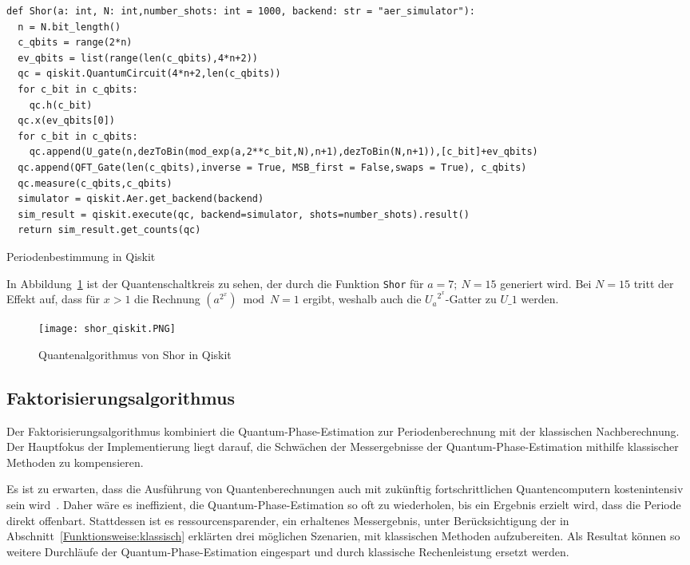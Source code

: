 \begin{listing}[H]
\begin{verbatim}  
def Shor(a: int, N: int,number_shots: int = 1000, backend: str = "aer_simulator"):
  n = N.bit_length()
  c_qbits = range(2*n)
  ev_qbits = list(range(len(c_qbits),4*n+2))
  qc = qiskit.QuantumCircuit(4*n+2,len(c_qbits)) 
  for c_bit in c_qbits:
    qc.h(c_bit)
  qc.x(ev_qbits[0])
  for c_bit in c_qbits:
    qc.append(U_gate(n,dezToBin(mod_exp(a,2**c_bit,N),n+1),dezToBin(N,n+1)),[c_bit]+ev_qbits)
  qc.append(QFT_Gate(len(c_qbits),inverse = True, MSB_first = False,swaps = True), c_qbits)
  qc.measure(c_qbits,c_qbits)
  simulator = qiskit.Aer.get_backend(backend)
  sim_result = qiskit.execute(qc, backend=simulator, shots=number_shots).result()
  return sim_result.get_counts(qc)
  \end{verbatim}
  \caption{Periodenbestimmung in Qiskit}
  \label{code:Periodenbestimmung}
\end{listing}

In Abbildung~\ref{fig:shor_qiskit} ist der Quantenschaltkreis zu sehen, 
der durch die Funktion \texttt{Shor} für \(a=7;~N=15\) generiert wird.
Bei \(N=15\) tritt der Effekt auf, dass für \(x>1\) die Rechnung \((a^{2^x})\bmod N = 1\) ergibt, 
weshalb auch die \({U_a}^{2^x}\)-Gatter zu \(U\_1\) werden.

\begin{figure}[H]
  \centering
  \texttt{[image: shor\_qiskit.PNG]}
  \caption{Quantenalgorithmus von Shor in Qiskit}
  \label{fig:shor_qiskit}
\end{figure}

\subsection{Faktorisierungsalgorithmus} \label{sec:Faktorisierungsalgorithmus}
Der Faktorisierungsalgorithmus kombiniert die Quantum-Phase-Estimation zur Periodenberechnung mit  
der klassischen Nachberechnung. 
Der Hauptfokus der Implementierung liegt darauf, 
die Schwächen der Messergebnisse der Quantum-Phase-Estimation mithilfe klassischer Methoden zu kompensieren.

Es ist zu erwarten, 
dass die Ausführung von Quantenberechnungen auch mit zukünftig fortschrittlichen Quantencomputern kostenintensiv sein wird~\cite{Shor_1997}.
Daher wäre es ineffizient, 
die Quantum-Phase-Estimation so oft zu wiederholen, 
bis ein Ergebnis erzielt wird, dass die Periode direkt offenbart.
Stattdessen ist es ressourcensparender, 
ein erhaltenes Messergebnis, 
unter Berücksichtigung der in Abschnitt~\ref{Funktionsweise:klassisch} erklärten drei möglichen Szenarien,
mit klassischen Methoden aufzubereiten. 
Als Resultat können so weitere Durchläufe der Quantum-Phase-Estimation eingespart und 
durch klassische Rechenleistung ersetzt werden.

